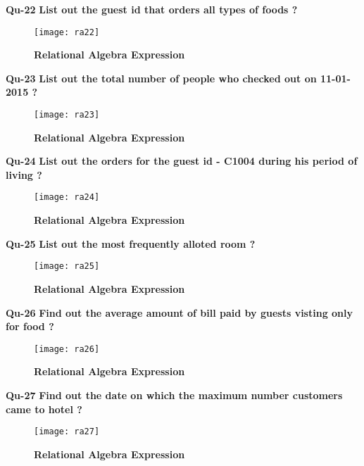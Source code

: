 \documentclass[a4,12pt]{report}
\begin{document}
\newpage
\textbf{Qu-22} \textbf{ List out the guest id that orders all types of foods ? }\\

\begin{figure}[hbtp]
\centering
\texttt{[image: ra22]}
\caption{\textbf{{\color{red}Relational Algebra Expression}}}
\end{figure}

\textbf{Qu-23} \textbf{ List out the total number of people who checked out on 11-01-2015 ?}\\

\begin{figure}[hbtp]
\centering
\texttt{[image: ra23]}
\caption{\textbf{{\color{red}Relational Algebra Expression}}}
\end{figure}

\newpage
\textbf{Qu-24} \textbf{ List out the orders for the guest id - C1004 during his period of living ? }\\

\begin{figure}[hbtp]
\centering
\texttt{[image: ra24]}
\caption{\textbf{{\color{red}Relational Algebra Expression}}}
\end{figure}

\textbf{Qu-25} \textbf{ List out the most frequently alloted room ? }\\

\begin{figure}[hbtp]
\centering
\texttt{[image: ra25]}
\caption{\textbf{{\color{red}Relational Algebra Expression}}}
\end{figure}

\newpage
\textbf{Qu-26} \textbf{ Find out the average amount of bill paid by guests visting only for food ? }\\

\begin{figure}[hbtp]
\centering
\texttt{[image: ra26]}
\caption{\textbf{{\color{red}Relational Algebra Expression}}}
\end{figure}

\textbf{Qu-27} \textbf{ Find out the date on which the maximum number customers came to hotel ? }\\

\begin{figure}[hbtp]
\centering
\texttt{[image: ra27]}
\caption{\textbf{{\color{red}Relational Algebra Expression}}}
\end{figure}
\end{document}
